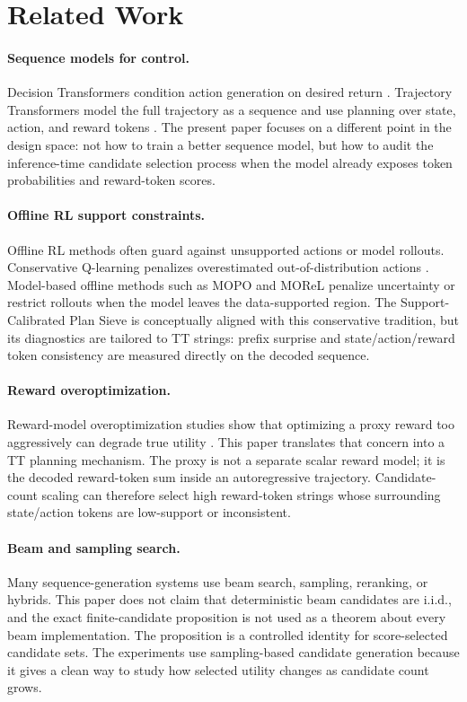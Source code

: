 \documentclass{article}
\newcommand{\method}{Support-Calibrated Plan Sieve}
\begin{document}
\section{Related Work}

\paragraph{Sequence models for control.}
Decision Transformers condition action generation on desired return \citep{chen2021decision}. Trajectory Transformers model the full trajectory as a sequence and use planning over state, action, and reward tokens \citep{janner2021trajectory}. The present paper focuses on a different point in the design space: not how to train a better sequence model, but how to audit the inference-time candidate selection process when the model already exposes token probabilities and reward-token scores.

\paragraph{Offline RL support constraints.}
Offline RL methods often guard against unsupported actions or model rollouts. Conservative Q-learning penalizes overestimated out-of-distribution actions \citep{kumar2020conservative}. Model-based offline methods such as MOPO \citep{yu2020mopo} and MOReL \citep{kidambi2020morel} penalize uncertainty or restrict rollouts when the model leaves the data-supported region. The \method{} is conceptually aligned with this conservative tradition, but its diagnostics are tailored to TT strings: prefix surprise and state/action/reward token consistency are measured directly on the decoded sequence.

\paragraph{Reward overoptimization.}
Reward-model overoptimization studies show that optimizing a proxy reward too aggressively can degrade true utility \citep{gao2023scaling}. This paper translates that concern into a TT planning mechanism. The proxy is not a separate scalar reward model; it is the decoded reward-token sum inside an autoregressive trajectory. Candidate-count scaling can therefore select high reward-token strings whose surrounding state/action tokens are low-support or inconsistent.

\paragraph{Beam and sampling search.}
Many sequence-generation systems use beam search, sampling, reranking, or hybrids. This paper does not claim that deterministic beam candidates are i.i.d., and the exact finite-candidate proposition is not used as a theorem about every beam implementation. The proposition is a controlled identity for score-selected candidate sets. The experiments use sampling-based candidate generation because it gives a clean way to study how selected utility changes as candidate count grows.
\end{document}
